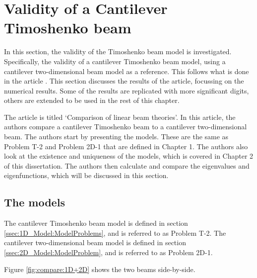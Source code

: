 \documentclass[../../main.tex]{subfiles}
\begin{document}
\section{Validity of a Cantilever Timoshenko beam} \label{sec:validity-of-a-cantilever-timoshenko-beam}

In this section, the validity of the Timoshenko beam model is investigated. Specifically, the validity of a cantilever Timoshenko beam model, using a cantilever two-dimensional beam model as a reference. This follows what is done in the article \cite{LVV09}. This section discusses the results of the article, focussing on the numerical results. Some of the results are replicated with more significant digits, others are extended to be used in the rest of this chapter.

The article \cite{LVV09} is titled `Comparison of linear beam theories'. In this article, the authors compare a cantilever Timoshenko beam to a cantilever two-dimensional beam. The authors start by presenting the models. These are the same as Problem T-2 and Problem 2D-1 that are defined in Chapter 1. The authors also look at the existence and uniqueness of the models, which is covered in Chapter 2 of this dissertation. The authors then calculate and compare the eigenvalues and eigenfunctions, which will be discussed in this section.

\subsection{The models}
The cantilever Timoshenko beam model is defined in section \ref{ssec:1D_Model:ModelProblems}, and is referred to as Problem T-2. The cantilever two-dimensional beam model is defined in section \ref{ssec:2D_Model:ModelProblem}, and is referred to as Problem 2D-1.

Figure \ref{fig:compare:1D+2D} shows the two beams side-by-side.
\end{document}
